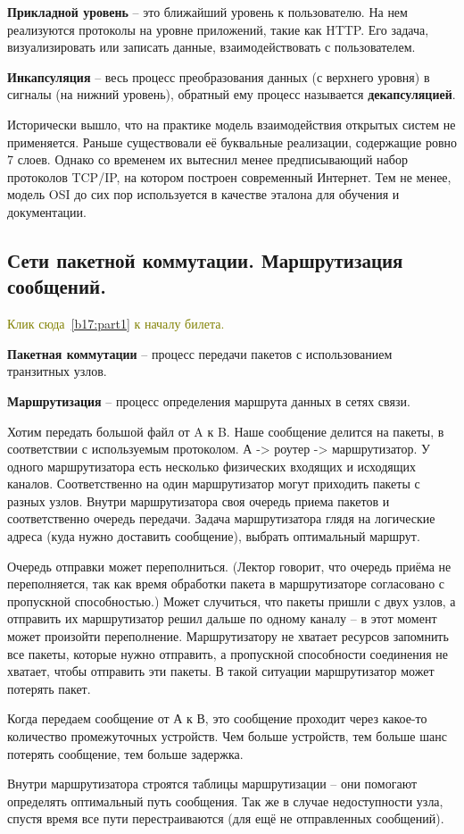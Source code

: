 \textbf{Прикладной уровень} -- это ближайший уровень к пользователю. На нем реализуются протоколы на уровне приложений, такие как HTTP.  Его задача, визуализировать или записать данные, взаимодействовать с пользователем.

\textbf{Инкапсуляция} -- весь процесс преобразования данных (с верхнего уровня) в сигналы (на нижний уровень), обратный ему процесс называется \textbf{декапсуляцией}.

Исторически вышло, что на практике модель взаимодействия открытых систем не применяется. Раньше существовали её буквальные реализации, содержащие ровно 7 слоев. Однако со временем их вытеснил менее предписывающий набор протоколов TCP/IP, на котором построен современный Интернет. Тем не менее, модель OSI до сих пор используется в качестве эталона для обучения и документации.


\subsection*{Сети пакетной коммутации. Маршрутизация сообщений.}\label{b17:part2}

\textcolor{olive}{Клик сюда~\ref{b17:part1} к началу билета.}

\textbf{Пакетная коммутации} -- процесс передачи пакетов с использованием транзитных узлов.

\textbf{Маршрутизация} -- процесс определения маршрута данных в сетях связи.

Хотим передать большой файл от A к B. Наше сообщение делится на пакеты, в соответствии с используемым протоколом.
А -> роутер -> маршрутизатор.
У одного маршрутизатора есть несколько физических входящих и исходящих каналов. Соответственно на один маршрутизатор могут приходить пакеты с разных узлов. Внутри маршрутизатора своя очередь приема пакетов и соответственно очередь передачи.
Задача маршрутизатора глядя на логические адреса (куда нужно доставить сообщение), выбрать оптимальный маршрут.

Очередь отправки может переполниться. (Лектор говорит, что очередь приёма не переполняется, так как время обработки пакета в маршрутизаторе согласовано с пропускной способностью.) Может случиться, что пакеты пришли с двух узлов, а отправить их маршрутизатор решил дальше по одному каналу -- в этот момент может произойти переполнение.
Маршрутизатору не хватает ресурсов запомнить все пакеты, которые нужно отправить, а пропускной способности соединения не хватает, чтобы отправить эти пакеты. В такой ситуации маршрутизатор может потерять пакет.

Когда передаем сообщение от А к В, это сообщение проходит через какое-то количество промежуточных устройств. Чем больше устройств, тем больше шанс потерять сообщение, тем больше задержка.

Внутри маршрутизатора строятся таблицы маршрутизации -- они помогают определять оптимальный путь сообщения. Так же в случае недоступности узла, спустя время все пути перестраиваются (для ещё не отправленных сообщений).